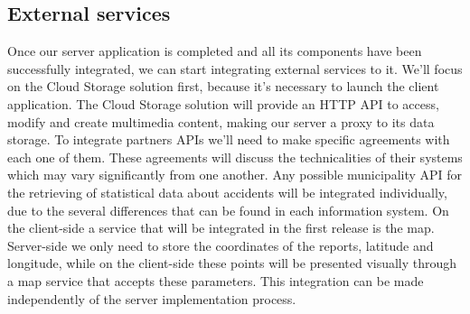 \subsection{External services}
Once our server application is completed and all its components have been successfully integrated,
we can start integrating external services to it.
\newline
\newline
We'll focus on the Cloud Storage solution first, because it's necessary to launch the client application.
The Cloud Storage solution will provide an HTTP API to access, modify and create multimedia content,
making our server a proxy to its data storage.
\newline
\newline
To integrate partners APIs we'll need to make specific agreements with each one of them. These
agreements will discuss the technicalities of their systems which may vary significantly from
one another.
\newline
\newline
Any possible municipality API for the retrieving of
statistical data about accidents will be integrated individually, due to the several differences
that can be found in each information system.
\newline
\newline
On the client-side a service that will be integrated in the first release is the map. Server-side we only need
to store the coordinates of the reports, latitude and longitude, while on the client-side these points will be presented
visually through a map service that accepts these parameters. 
This integration can be made independently of the server implementation process.
